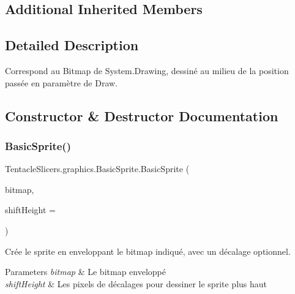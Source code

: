 \subsection*{Additional Inherited Members}


\subsection{Detailed Description}
Correspond au Bitmap de System.\+Drawing, dessiné au milieu de la position passée en paramètre de Draw. 



\subsection{Constructor \& Destructor Documentation}
\mbox{\label{class_tentacle_slicers_1_1graphics_1_1_basic_sprite_a7e920b54d36041db7a3d7fdcc4f37f0b}} 
\subsubsection{\texorpdfstring{Basic\+Sprite()}{BasicSprite()}\hspace{0.1cm}{\footnotesize\ttfamily [1/2]}}
{\footnotesize\ttfamily Tentacle\+Slicers.\+graphics.\+Basic\+Sprite.\+Basic\+Sprite (\begin{DoxyParamCaption}\item[{Bitmap}]{bitmap,  }\item[{int}]{shift\+Height = {} }\end{DoxyParamCaption})}



Crée le sprite en enveloppant le bitmap indiqué, avec un décalage optionnel. 


\begin{DoxyParams}{Parameters}
{\em bitmap} & Le bitmap enveloppé \\
\hline
{\em shift\+Height} & Les pixels de décalages pour dessiner le sprite plus haut \\
\hline
\end{DoxyParams}
\mbox{\label{class_tentacle_slicers_1_1graphics_1_1_basic_sprite_a6f5c14f727a65f3a7af60541d001a34f}} 
